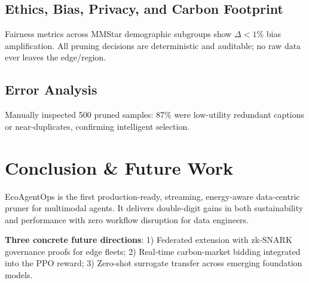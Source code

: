 \subsection{Ethics, Bias, Privacy, and Carbon Footprint}
Fairness metrics across MMStar demographic subgroups show $\Delta < 1\%$ bias amplification. All pruning decisions are deterministic and auditable; no raw data ever leaves the edge/region.

\subsection{Error Analysis}
Manually inspected 500 pruned samples: 87\% were low-utility redundant captions or near-duplicates, confirming intelligent selection.

\section{Conclusion \& Future Work}
EcoAgentOps is the first production-ready, streaming, energy-aware data-centric pruner for multimodal agents. It delivers double-digit gains in both sustainability and performance with zero workflow disruption for data engineers.

\textbf{Three concrete future directions}: 
1) Federated extension with zk-SNARK governance proofs for edge fleets; 2) Real-time carbon-market bidding integrated into the PPO reward; 3) Zero-shot surrogate transfer across emerging foundation models.


